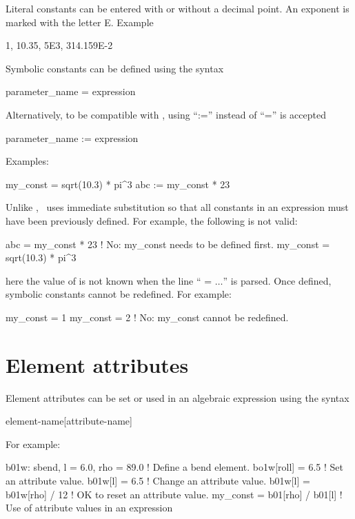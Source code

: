 Literal constants can be entered with or without a decimal point. An
exponent is marked with the letter E. Example
\begin{example}
  1, 10.35, 5E3, 314.159E-2
\end{example}
Symbolic constants can be defined using the syntax
\begin{example}
  parameter_name = expression
\end{example}
Alternatively, to be compatible with \mad, using ``:='' instead of ``='' is accepted
\begin{example}
  parameter_name := expression
\end{example}
Examples:
\begin{example}
  my_const = sqrt(10.3) * pi^3
  abc     := my_const * 23
\end{example}
Unlike \mad, \bmad\ uses immediate substitution so that all constants
in an expression must have been previously defined. For example, the
following is not valid:
\begin{example}
  abc      = my_const * 23      ! No: my_const needs to be defined first.
  my_const = sqrt(10.3) * pi^3
\end{example}
here the value of  is not known when the line ``
= $\ldots$'' is parsed. Once
defined, symbolic constants cannot be redefined. For example:
\begin{example}
  my_const = 1
  my_const = 2  ! No: my_const cannot be redefined.
\end{example}


\section{Element attributes}

Element attributes can be set or used in an algebraic expression
using the syntax
\begin{example}
  element-name[attribute-name]
\end{example}
For example:
\begin{example}
  b01w: sbend, l = 6.0, rho = 89.0   ! Define a bend element.
  bo1w[roll] = 6.5                   ! Set an attribute value.
  b01w[l] = 6.5                      ! Change an attribute value.
  b01w[l] = b01w[rho] / 12           ! OK to reset an attribute value.
  my_const = b01[rho] / b01[l]       ! Use of attribute values in an expression
\end{example}

